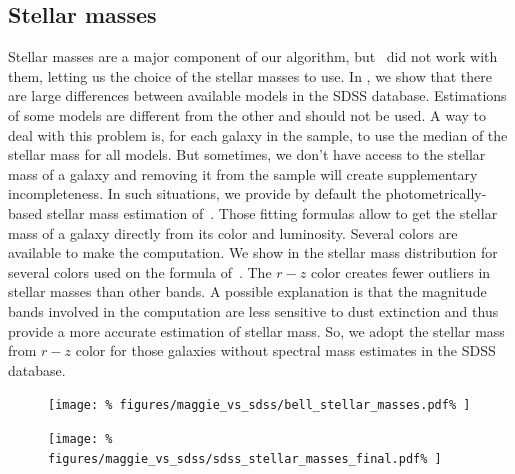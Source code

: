 \subsection{Stellar masses}
\label{sub:stellar_masses}

Stellar masses are a major component of our algorithm, but~\cite{Tempel+14} did
not work with them, letting us the choice of the stellar masses to use. In
, we show that there are large differences
between available models in the SDSS database. Estimations of some models are
different from the other and should not be used. A way to deal with this
problem is, for each galaxy in the sample, to use the median of the stellar
mass for all models. But sometimes, we don't have access to the stellar mass of
a galaxy and removing it from the sample will create supplementary
incompleteness. In such situations, we provide by default the
photometrically-based stellar mass estimation  of~\cite{Bell+03}. Those fitting
formulas allow to get the stellar mass of a galaxy directly from its color and
luminosity. Several colors are available to make the computation. We show in
 the stellar mass distribution for several
colors used on the formula of~\cite{Bell+03}. The $r-z$ color creates fewer
outliers in stellar masses than other bands. A possible explanation is that the
magnitude bands involved in the computation are less sensitive to dust
extinction and thus provide a more accurate estimation of stellar mass. So, we
adopt the stellar mass from $r-z$ color for those galaxies without spectral
mass estimates in the SDSS database.

\begin{figure}[htb]
    \centering
    \begin{minipage}{0.49\linewidth}
        \centering
        \texttt{[image: \%
            figures/maggie\_vs\_sdss/bell\_stellar\_masses.pdf\%
        ]}
    \end{minipage}
    \begin{minipage}{0.49\linewidth}
        \centering
        \texttt{[image: \%
            figures/maggie\_vs\_sdss/sdss\_stellar\_masses\_final.pdf\%
        ]}
    \end{minipage}
\end{figure}

